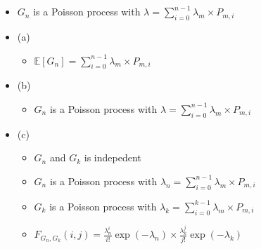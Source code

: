 \documentclass[a4paper]{article}
\begin{document}
\section{}
\begin{itemize}
\begin{figure} [H]
    \texttt{[image: question/2.png]}
\end{figure}
    \item $G_n$ is a Poisson process with $\lambda = \sum_{i = 0}^{n-1} \lambda_m \times P_{m,i}$
    \item (a)
        \begin{itemize}
            \item $\mathbb{E}[G_n] = \sum_{i = 0}^{n-1} \lambda_m \times P_{m,i}$
        \end{itemize}
    \item (b)
        \begin{itemize}
            \item $G_n$ is a Poisson process with $\lambda = \sum_{i = 0}^{n-1} \lambda_m \times P_{m,i}$
        \end{itemize}
    \item (c)
        \begin{itemize}
            \item $G_n$ and $G_k$ is indepedent
            \item $G_n$ is a Poisson process with $\lambda_n = \sum_{i = 0}^{n-1} \lambda_m \times P_{m,i}$
            \item $G_k$ is a Poisson process with $\lambda_k = \sum_{i = 0}^{k-1} \lambda_m \times P_{m,i}$
            \item $F_{G_n, G_k}(i, j) = \frac{\lambda_n^i}{i!}\exp(-\lambda_n) \times \frac{\lambda_k^j}{j!}\exp(-\lambda_k)$
        \end{itemize}
\end{itemize}
\end{document}
